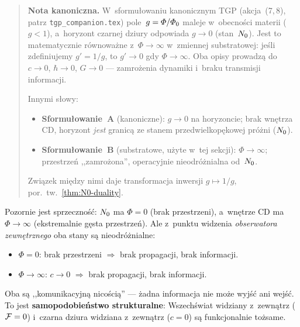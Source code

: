 \begin{quote}
\textbf{Nota kanoniczna.}
W~sformu\l{}owaniu kanonicznym TGP (akcja~(7,\,8),
patrz \texttt{tgp\_companion.tex}) pole~$g = \varPhi/\varPhi_0$
maleje w~obecno\'sci materii ($g < 1$), a~horyzont czarnej dziury
odpowiada $g \to 0$ (stan~$N_0$).
Jest to matematycznie r\'ownowa\.zne z~$\Phi \to \infty$
w~zmiennej substratowej: je\'sli zdefiniujemy $g' = 1/g$,
to $g' \to 0$ gdy $\Phi \to \infty$.
Oba opisy prowadz\k{a} do $c \to 0$, $\hbar \to 0$, $G \to 0$
--- zamro\.zenia dynamiki i~braku transmisji informacji.

\medskip\noindent
Innymi s\l{}owy:
\begin{itemize}[nosep]
  \item \textbf{Sformu\l{}owanie~A} (kanoniczne):
    $g \to 0$ na horyzoncie; brak wn\k{e}trza CD,
    horyzont \emph{jest} granic\k{a} ze stanem
    przedwielkop\k{e}kowej pr\'o\.zni ($N_0$).
  \item \textbf{Sformu\l{}owanie~B} (substratowe, u\.zyte w~tej sekcji):
    $\Phi \to \infty$; przestrze\'n ,,zamro\.zona'',
    operacyjnie nieodr\'o\.znialna od~$N_0$.
\end{itemize}
Zwi\k{a}zek mi\k{e}dzy nimi daje transformacja inwersji
$g \mapsto 1/g$, por.\ tw.~\ref{thm:N0-duality}.
\end{quote}

\begin{remark}
Pozornie jest sprzeczno\'s\'c: $N_0$ ma $\Phi = 0$ (brak
przestrzeni), a~wn\k{e}trze CD ma $\Phi \to \infty$ (ekstremalnie
g\k{e}sta przestrze\'n). Ale z~punktu widzenia \emph{obserwatora
zewn\k{e}trznego} oba stany s\k{a} nieodr\'o\.znialne:
\begin{itemize}[nosep]
  \item $\Phi = 0$: brak przestrzeni $\Rightarrow$ brak
        propagacji, brak informacji.
  \item $\Phi \to \infty$: $c \to 0$ $\Rightarrow$ brak
        propagacji, brak informacji.
\end{itemize}
Oba s\k{a} ,,komunikacyjn\k{a} nico\'sci\k{a}'' --- \.zadna informacja
nie mo\.ze wyj\'s\'c ani wej\'s\'c. To jest \textbf{samopodobie\'nstwo
strukturalne}: Wszech\'swiat widziany z~zewn\k{a}trz ($\mathcal{F} = 0$)
i~czarna dziura widziana z~zewn\k{a}trz ($c = 0$) s\k{a}
funkcjonalnie to\.zsame.
\end{remark}

